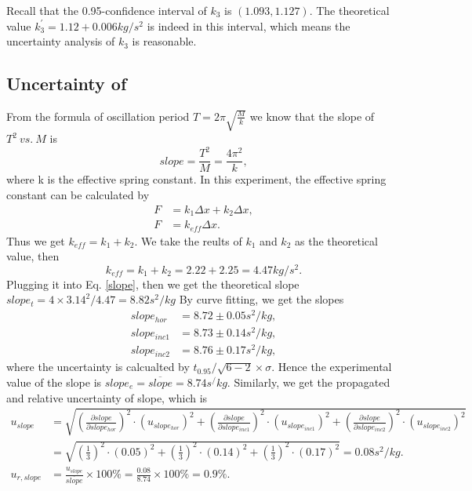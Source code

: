     Recall that the 0.95-confidence interval of $k_3$ is $(1.093,1.127)$. The theoretical value $k_3^{'}=1.12+0.006 kg/s^2$ is indeed in this interval, which means the uncertainty analysis of $k_3$ is reasonable.\\
    
\subsection{Uncertainty of }
    From the formula of oscillation period $T=2\pi\sqrt{\frac{M}{k}}$ we know that the slope of $T^2\ vs.\ M$ is
    \begin{equation}\label{slope}
        slope=\frac{T^2}{M}=\frac{4\pi^2}{k},
    \end{equation}
    where k is the effective spring constant. In this experiment, the effective spring constant can be calculated by
    \[ 
    \begin{split}
        F&=k_1\Delta x+k_2\Delta x,\\
        F&=k_{eff}\Delta x.
    \end{split}
    \]
    Thus we get $k_{eff}=k_1+k_2$. We take the reults of $k_1$ and $k_2$ as the theoretical value, then
    \[
        k_{eff}=k_1+k_2=2.22+2.25=4.47kg/s^2.
    \]
    Plugging it into Eq. \ref{slope}, then we get the theoretical slope $slope_t=4\times 3.14^2/4.47=8.82s^2/kg$
    By curve fitting, we get the slopes
    \[
    \begin{split}
        slope_{hor}&=8.72\pm 0.05s^2/kg,\\
        slope_{inc1}&=8.73\pm 0.14s^2/kg,\\
        slope_{inc2}&=8.76\pm 0.17s^2/kg,
    \end{split}
    \]
    where the uncertainty is calcualted by $t_0.95/\sqrt{6-2}\times \sigma$.
    Hence the experimental value of the slope is $slope_e=\overline{slope}=8.74s^/kg$.
    Similarly, we get the propagated and relative uncertainty of slope, which is
    \[
    \begin{split}
        u_{slope}&=\sqrt{(\frac{\partial slope}{\partial slope_{hor}})^2\cdot(u_{slope_{hor}})^2+(\frac{\partial slope}{\partial slope_{inc1}})^2\cdot(u_{slope_{inc1}})^2+(\frac{\partial slope}{\partial slope_{inc2}})^2\cdot(u_{slope_{inc2}})^2}\\
        &=\sqrt{(\frac{1}{3})^2\cdot(0.05)^2+(\frac{1}{3})^2\cdot(0.14)^2+(\frac{1}{3})^2\cdot(0.17)^2}=0.08s^2/kg.\\
        u_{r,slope}&=\frac{u_{slope}}{\overline{slope}}\times100\%=\frac{0.08}{8.74}\times100\%=0.9\%.
    \end{split}
    \]

